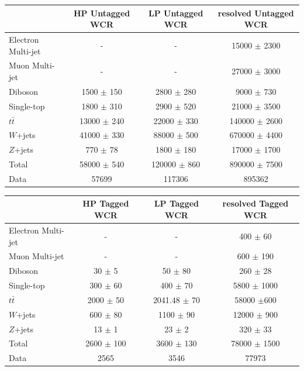 \begin{table}
\begin{tabular}{|l|c|c|c|}
\hline
	  &	 HP  Untagged WCR &	 LP Untagged WCR &	resolved Untagged WCR \\\hline 
	Electron Multi-jet &	- &	- &	15000 $\pm$ 2300 \\\hline 
	Muon Multi-jet &	- &	- &	27000 $\pm$ 3000 \\\hline 
	Diboson &	1500 $\pm$ 150 &	2800 $\pm$ 280 &	9000 $\pm$ 730 \\\hline 
	Single-top &	1800 $\pm$ 310 &	2900 $\pm$ 520 &	21000 $\pm$ 3500 \\\hline 
	$t\bar{t}$ &	13000 $\pm$ 240 &	22000 $\pm$ 330 &	140000 $\pm$ 2600 \\\hline 
	$W$+jets &	41000 $\pm$ 330 &	88000 $\pm$ 500 &	670000 $\pm$ 4400 \\\hline 
	$Z$+jets &	770 $\pm$ 78 &	1800 $\pm$ 180 &	17000 $\pm$ 1700 \\\hline 
	Total &	58000 $\pm$ 540 &	120000 $\pm$ 860 &	890000 $\pm$ 7500 \\\hline 
	Data &	57699 &	117306 &	895362 \\\hline 
\end{tabular}


\begin{tabular}{|l|c|c|c|}
\hline
	  &	 HP Tagged WCR &	 LP Tagged WCR &	resolved Tagged WCR \\\hline 
	Electron Multi-jet &	- &	- &	400 $\pm$ 60 \\\hline 
	Muon Multi-jet &	- &	- &	600 $\pm$ 190 \\\hline 
	Diboson &	30 $\pm$ 5 &	50 $\pm$ 80&	260 $\pm$ 28 \\\hline 
	Single-top &	300 $\pm$ 60 &	400 $\pm$ 70 &	5800 $\pm$ 1000 \\\hline 
	$t\bar{t}$ &	2000 $\pm$ 50&	2041.48 $\pm$ 70 &	58000 $\pm$600 \\\hline 
	$W$+jets &	600 $\pm$ 80 &	1100 $\pm$ 90 &	12000 $\pm$ 900 \\\hline 
	$Z$+jets &	13 $\pm$ 1 &	23 $\pm$ 2 &	320 $\pm$ 33 \\\hline 
	Total &	2600 $\pm$ 100 &	3600 $\pm$ 130 &	78000 $\pm$ 1500 \\\hline 
	Data &	2565 &	3546 &	77973 \\\hline 
\end{tabular}


\end{table}
